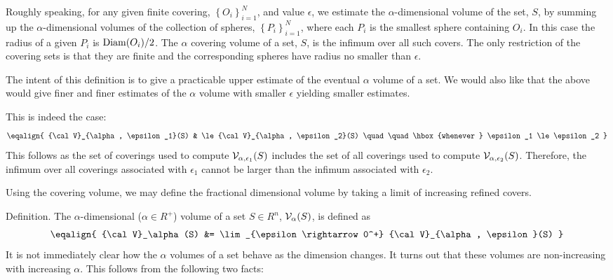 {Roughly speaking, for any given finite covering, 
$\left\{ O_i \right\}_{i=1}^N$, and value $\epsilon$, 
we estimate the $\alpha$-dimensional volume of the set, $S$, by summing 
up the $\alpha$-dimensional volumes of the collection of spheres, 
$\left\{ P_i \right\}_{i=1}^N$, where each $P_i$ is the 
smallest sphere containing $O_i$. In this case the radius of a given 
$P_i$ is ${\rm Diam}(O_i) / 2$.
The $\alpha$ covering volume of a set, $S$, is the infimum over all 
such covers. The only restriction of the covering sets is that they are 
finite and the corresponding spheres have radius no smaller than $\epsilon$.

The intent of this definition is to give a practicable upper estimate of 
the eventual $\alpha$ volume of a set. We would also like that the above 
would give finer and finer estimates of the $\alpha$ volume with 
smaller $\epsilon$ yielding smaller estimates.

This is indeed the case:
$$
\eqalign{
	{\cal V}_{\alpha, \epsilon_1}(S) & \le {\cal V}_{\alpha, \epsilon_2}(S) \quad \quad \hbox{whenever  } \epsilon_1 \le \epsilon_2
}
$$
This follows as the set of coverings used to compute 
${\cal V}_{\alpha, \epsilon_1}(S)$ includes the set of all coverings used 
to compute ${\cal V}_{\alpha, \epsilon_2}(S)$. Therefore, the 
infimum over all coverings associated with $\epsilon_1$ cannot be larger
than the infimum associated with $\epsilon_2$.

Using the covering volume, we may define the fractional dimensional volume by
taking a limit of increasing refined covers.

\proclaim Definition. The $\alpha$-dimensional ($\alpha \in R^{+}$)
volume of a set $S \in R^n$, ${\cal V}_\alpha(S)$,
is defined as
$$
\eqalign{
	{\cal V}_\alpha(S) &= \lim_{\epsilon \rightarrow 0^+} {\cal V}_{\alpha, \epsilon}(S)
}
$$
It is not immediately clear how the $\alpha$ volumes of a set behave as the 
dimension changes. It turns out that these volumes are non-increasing 
with increasing $\alpha$. This follows from the following two facts:

\beginEnum
{}
\endEnum

}
